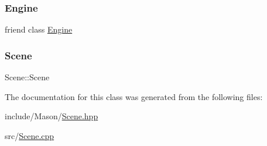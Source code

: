 \subsubsection{\texorpdfstring{Engine}{Engine}}
{\footnotesize\ttfamily friend class \hyperlink{class_mason_1_1_engine}{Engine}\hspace{0.3cm}{\ttfamily [friend]}}

\hypertarget{class_mason_1_1_scene_a8060d758084fa30aaed3278425b90665}{}\label{class_mason_1_1_scene_a8060d758084fa30aaed3278425b90665} 
\subsubsection{\texorpdfstring{Scene}{Scene}}
{\footnotesize\ttfamily Scene\+::\+Scene\hspace{0.3cm}{\ttfamily [friend]}}



The documentation for this class was generated from the following files\+:\begin{DoxyCompactItemize}
\item 
include/\+Mason/\hyperlink{_scene_8hpp}{Scene.\+hpp}\item 
src/\hyperlink{_scene_8cpp}{Scene.\+cpp}\end{DoxyCompactItemize}
